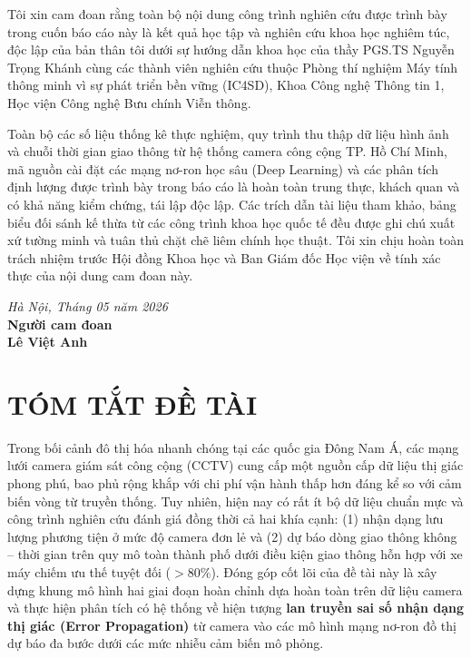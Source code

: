 \documentclass[12pt,a4paper,oneside]{report}
\begin{document}
Tôi xin cam đoan rằng toàn bộ nội dung công trình nghiên cứu được trình bày trong cuốn báo cáo này là kết quả học tập và nghiên cứu khoa học nghiêm túc, độc lập của bản thân tôi dưới sự hướng dẫn khoa học của thầy PGS.TS Nguyễn Trọng Khánh cùng các thành viên nghiên cứu thuộc Phòng thí nghiệm Máy tính thông minh vì sự phát triển bền vững (IC4SD), Khoa Công nghệ Thông tin 1, Học viện Công nghệ Bưu chính Viễn thông.

Toàn bộ các số liệu thống kê thực nghiệm, quy trình thu thập dữ liệu hình ảnh và chuỗi thời gian giao thông từ hệ thống camera công cộng TP. Hồ Chí Minh, mã nguồn cài đặt các mạng nơ-ron học sâu (Deep Learning) và các phân tích định lượng được trình bày trong báo cáo là hoàn toàn trung thực, khách quan và có khả năng kiểm chứng, tái lập độc lập. Các trích dẫn tài liệu tham khảo, bảng biểu đối sánh kế thừa từ các công trình khoa học quốc tế đều được ghi chú xuất xứ tường minh và tuân thủ chặt chẽ liêm chính học thuật. Tôi xin chịu hoàn toàn trách nhiệm trước Hội đồng Khoa học và Ban Giám đốc Học viện về tính xác thực của nội dung cam đoan này.

\vspace{1.5cm}
\begin{flushright}
    \textit{Hà Nội, Tháng 05 năm 2026} \\
    \textbf{Người cam đoan} \\
    \vspace{1.5cm}
    \textbf{Lê Việt Anh}
\end{flushright}

\newpage
\chapter*{TÓM TẮT ĐỀ TÀI}

Trong bối cảnh đô thị hóa nhanh chóng tại các quốc gia Đông Nam Á, các mạng lưới camera giám sát công cộng (CCTV) cung cấp một nguồn cấp dữ liệu thị giác phong phú, bao phủ rộng khắp với chi phí vận hành thấp hơn đáng kể so với cảm biến vòng từ truyền thống. Tuy nhiên, hiện nay có rất ít bộ dữ liệu chuẩn mực và công trình nghiên cứu đánh giá đồng thời cả hai khía cạnh: (1) nhận dạng lưu lượng phương tiện ở mức độ camera đơn lẻ và (2) dự báo dòng giao thông không -- thời gian trên quy mô toàn thành phố dưới điều kiện giao thông hỗn hợp với xe máy chiếm ưu thế tuyệt đối ($>80\%$). Đóng góp cốt lõi của đề tài này là xây dựng khung mô hình hai giai đoạn hoàn chỉnh dựa hoàn toàn trên dữ liệu camera và thực hiện phân tích có hệ thống về hiện tượng \textbf{lan truyền sai số nhận dạng thị giác (Error Propagation)} từ camera vào các mô hình mạng nơ-ron đồ thị dự báo đa bước dưới các mức nhiễu cảm biến mô phỏng.
\end{document}
